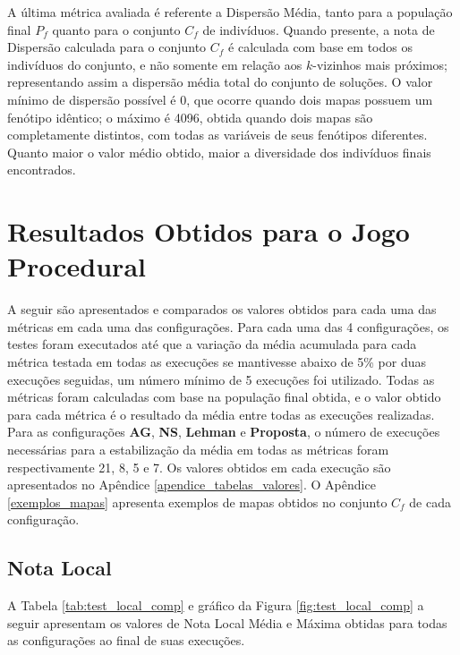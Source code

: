 A última métrica avaliada é referente a Dispersão Média, tanto para a população final $P_f$ quanto para o conjunto $C_f$ de indivíduos. Quando presente, a nota de Dispersão calculada para o conjunto $C_f$ é calculada com base em todos os indivíduos do conjunto, e não somente em relação aos $k$-vizinhos mais próximos; representando assim a dispersão média total do conjunto de soluções. O valor mínimo de dispersão possível é 0, que ocorre quando dois mapas possuem um fenótipo idêntico; o máximo é 4096, obtida quando dois mapas são completamente distintos, com todas as variáveis de seus fenótipos diferentes. Quanto maior o valor médio obtido, maior a diversidade dos indivíduos finais encontrados.

\section{Resultados Obtidos para o Jogo Procedural}
\label{resultados_obtidos_jogo_procedural}

A seguir são apresentados e comparados os valores obtidos para cada uma das métricas em cada uma das configurações. Para cada uma das 4 configurações, os testes foram executados até que a variação da média acumulada para cada métrica testada em todas as execuções se mantivesse abaixo de 5\% por duas execuções seguidas, um número mínimo de 5 execuções foi utilizado. Todas as métricas foram calculadas com base na população final obtida, e o valor obtido para cada métrica é o resultado da média entre todas as execuções realizadas. Para as configurações \textbf{AG}, \textbf{NS}, \textbf{Lehman} e \textbf{Proposta}, o número de execuções necessárias para a estabilização da média em todas as métricas foram respectivamente 21, 8, 5 e 7. Os valores obtidos em cada execução são apresentados no Apêndice \ref{apendice_tabelas_valores}. O Apêndice \ref{exemplos_mapas} apresenta exemplos de mapas obtidos no conjunto $C_f$ de cada configuração.

\subsection{Nota Local}
\label{metrica_nota_local}

A Tabela \ref{tab:test_local_comp} e gráfico da Figura \ref{fig:test_local_comp} a seguir apresentam os valores de Nota Local Média e Máxima obtidas para todas as configurações ao final de suas execuções.

